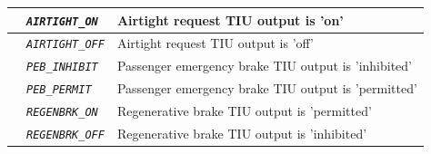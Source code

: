\begin{itemize}
\begin{longtable}{|l|l|l|}
			\hline

			&	\begin{minipage}[t]{0.40\linewidth} \emph{\texttt{AIRTIGHT\_ON}} \end{minipage}
			&	\begin{minipage}[t]{0.38\linewidth} Airtight request TIU output is ’on’ \end{minipage} \\

			\hline

			&	\begin{minipage}[t]{0.40\linewidth} \emph{\texttt{AIRTIGHT\_OFF}} \end{minipage}
			&	\begin{minipage}[t]{0.38\linewidth} Airtight request TIU output is ’off’ \end{minipage} \\

			\hline

			&	\begin{minipage}[t]{0.40\linewidth} \emph{\texttt{PEB\_INHIBIT}} \end{minipage}
			&	\begin{minipage}[t]{0.38\linewidth} Passenger emergency brake TIU output is ’inhibited’ \end{minipage} \\

			\hline

			&	\begin{minipage}[t]{0.40\linewidth} \emph{\texttt{PEB\_PERMIT}} \end{minipage}
			&	\begin{minipage}[t]{0.38\linewidth} Passenger emergency brake TIU output is ’permitted’ \end{minipage} \\

			\hline

			&	\begin{minipage}[t]{0.40\linewidth} \emph{\texttt{REGENBRK\_ON}} \end{minipage}
			&	\begin{minipage}[t]{0.38\linewidth} Regenerative brake TIU output is ’permitted’ \end{minipage} \\

			\hline

			&	\begin{minipage}[t]{0.40\linewidth} \emph{\texttt{REGENBRK\_OFF}} \end{minipage}
			&	\begin{minipage}[t]{0.38\linewidth} Regenerative brake TIU output is ’inhibited’ \end{minipage} \\


\end{longtable}
\end{itemize}
